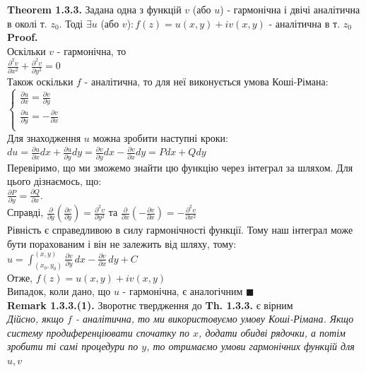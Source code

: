 \documentclass[a4paper, 14pt]{extarticle}
\def\hugespace{\vspace{5mm} \\}
\begin{document}
	\textbf{Theorem 1.3.3.} Задана одна з функцій $v$ (або $u$) - гармонічна і двічі аналітична в околі т. $z_0$. Тоді $\exists u$ (або $v$)$: f(z) = u(x,y) + iv(x,y)$ - аналітична в т. $z_0$\\
	\textbf{Proof.}\\
	Оскільки $v$ - гармонічна, то\\
	$\displaystyle\frac{\partial^2 v}{\partial x^2} + \frac{\partial^2 v}{\partial y^2} = 0$\\
	Також оскільки $f$ - аналітична, то для неї виконується умова Коші-Рімана:\\
	$
	\begin{cases}
		\displaystyle\frac{\partial u}{\partial x} = \frac{\partial v}{\partial y}\\
		\displaystyle\frac{\partial u}{\partial y} = -\frac{\partial v}{\partial x}\\
	\end{cases}
	$\\
	Для знаходження $u$ можна зробити наступні кроки:\\
	$\displaystyle du = \frac{\partial u}{\partial x}dx + \frac{\partial u}{\partial y}dy = \frac{\partial v}{\partial y}dx -\frac{\partial v}{\partial x}dy = Pdx+Qdy$\\
	Перевіримо, що ми зможемо знайти цю функцію через інтеграл за шляхом. Для цього дізнаємось, що:\\
	$\displaystyle \frac{\partial P}{\partial y} = \frac{\partial Q}{\partial x}$. 
	\\Справді, $\displaystyle \frac{\partial}{\partial y}\left( \frac{\partial v}{\partial y} \right) = \frac{\partial^2 v}{\partial y^2}$ та $\displaystyle \frac{\partial}{\partial x}\left( -\frac{\partial v}{\partial x} \right) = -\frac{\partial^2 v}{\partial x^2}$\\
	Рівність є справедливою в силу гармонічності функції. Тому наш інтеграл може бути порахованим і він не залежить від шляху, тому:\\
	$\displaystyle u = \int_{(x_0, y_0)}^{(x,y)} \frac{\partial v}{\partial y}\,dx -\frac{\partial v}{\partial x}\,dy + C$\\
	Отже, $f(z) = u(x,y) + iv(x,y)$\\
	Випадок, коли дано, що $u$ - гармонічна, є аналогічним $\blacksquare$
	\hugespace
	\textbf{Remark 1.3.3.(1).} Зворотнє твердження до \textbf{Th. 1.3.3.} є вірним\\
	\textit{Дійсно, якщо $f$ - аналітична, то ми використовуємо умову Коші-Рімана. Якщо систему продиференціювати спочатку по $x$, додати обидві рядочки, а потім зробити ті самі процедури по $y$, то отримаємо умови гармонічних функцій для $u,v$}
\end{document}
